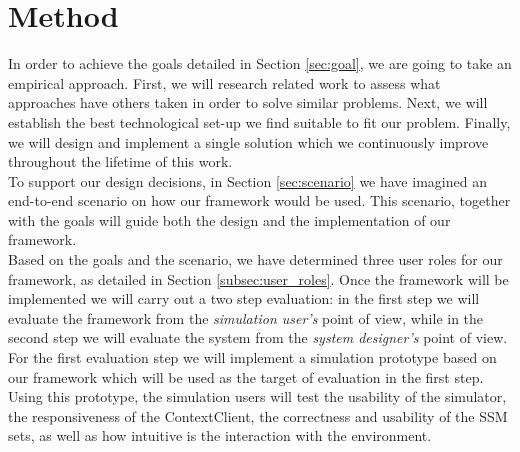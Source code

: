 \section{Method} %
\label{sec:method}
In order to achieve the goals detailed in Section \ref{sec:goal}, we are going to take an empirical approach. First, we will research related work to assess what approaches have others taken in order to solve similar problems. Next, we will establish the best technological set-up we find suitable to fit our problem. Finally, we will design and implement a single solution which we continuously improve throughout the lifetime of this work.\\


To support our design decisions, in Section \ref{sec:scenario} we have imagined an end-to-end scenario on how our framework would be used. This scenario, together with the goals will guide both the design and the implementation of our framework.\\

Based on the goals and the scenario, we have determined three user roles for our framework, as detailed in Section \ref{subsec:user_roles}. Once the framework will be implemented we will carry out a two step evaluation: in the first step we will evaluate the framework from the \emph{simulation user's} point of view, while in the second step we will evaluate the system from the \emph{system designer's} point of view.\\

For the first evaluation step we will implement a simulation prototype based on our framework which will be used as the target of evaluation in the first step. Using this prototype, the simulation users will test the usability of the simulator, the responsiveness of the ContextClient, the correctness and usability of the SSM sets, as well as how intuitive is the interaction with the environment.\\

